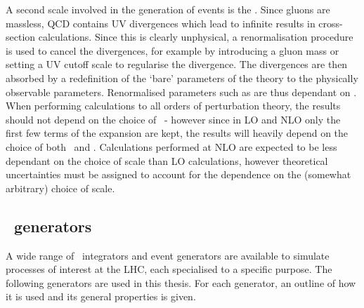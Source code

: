 A second scale involved in the generation of events is the
. Since gluons are massless, QCD contains UV
divergences which lead to infinite results in cross-section calculations. Since 
this is clearly unphysical, a renormalisation procedure is used to cancel the
divergences, for example by introducing a gluon mass or setting a UV cutoff
scale to regularise the divergence. The divergences are then absorbed by a
redefinition of the `bare' parameters of the theory to the physically observable
parameters. Renormalised parameters such as \alphaS are thus dependant on \uR.
When performing calculations to all orders of perturbation theory,  the results
should not depend on the choice of \uR\ - however since in LO and NLO only the
first few terms of the expansion are kept, the results will heavily depend on
the choice of both \uR\ and \uF. Calculations performed at NLO are expected to
be less dependant on the choice of scale than LO calculations, however
theoretical uncertainties must be assigned to account for the dependence on the
(somewhat arbitrary) choice of scale.

\subsection{\mc\ generators}
\label{sec:Theory-MC-gen}

A wide range of \mc\ integrators and event generators are available to simulate
processes of interest at the LHC, each specialised to a specific purpose. The
following generators are used in this thesis. For each generator, an outline of
how it is used and its general properties is given.

